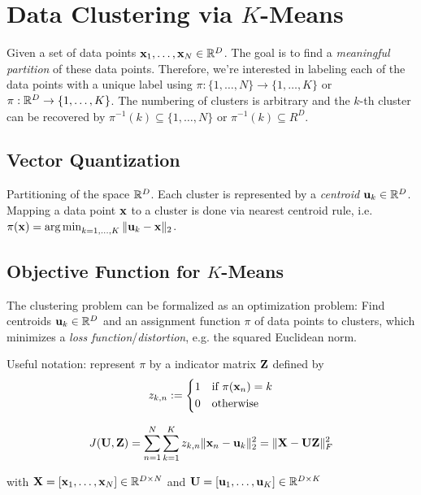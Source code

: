 \chapter{Data Clustering via \(K\)-Means}

Given a set of data points \(\mathbf{x}_1, \ldots, \mathbf{x}_N \in \mathbb{R}^D\). The goal is to find a \textit{meaningful partition} of these data points. Therefore, we're interested in labeling each of the data points with a unique label using \(\pi: \{1, \ldots, N\} \to \{1, \ldots, K\}\) or \(\pi: \mathbb{R}^D \to \{1, \ldots, K\}\). The numbering of clusters is arbitrary and the \(k\)-th cluster can be recovered by \(\pi^{-1}(k) \subseteq \{1, \ldots, N\}\) or \(\pi^{-1}(k) \subseteq R^D\).

\section{Vector Quantization}
Partitioning of the space \(\mathbb{R}^D\). Each cluster is represented by a \textit{centroid} \(\mathbf{u}_k \in \mathbb{R}^D\). Mapping a data point \(\mathbf{x}\) to a cluster is done via nearest centroid rule, i.e. \(\pi(\mathbf{x}) = \operatorname*{arg\,min}_{k=1,\ldots,K} \|\mathbf{u}_k - \mathbf{x}\|_2\).

\section{Objective Function for \(K\)-Means}
The clustering problem can be formalized as an optimization problem: Find centroids \(\mathbf{u}_k \in \mathbb{R}^D\) and an assignment function \(\pi\) of data points to clusters, which minimizes a \textit{loss function}/\textit{distortion}, e.g. the squared Euclidean norm.

Useful notation: represent \(\pi\) by a indicator matrix \(\mathbf{Z}\) defined by
\[
z_{k, n} := \begin{dcases*}
1 & if \(\pi(\matr{x}_n) = k\)\\
0 & otherwise
\end{dcases*}
\]

\begin{definition}
\[
J(\mathbf{U}, \mathbf{Z}) = \sum_{n=1}^N \sum_{k=1}^K z_{k, n} \| \mathbf{x}_n - \mathbf{u}_k \|_2^2 = \| \mathbf{X} - \mathbf{UZ} \|_F^2
\]

with \(\mathbf{X} = [\mathbf{x}_1, \ldots, \mathbf{x}_N] \in \mathbb{R}^{D \times N}\) and \(\mathbf{U} = [\mathbf{u}_1, \ldots, \mathbf{u}_K] \in \mathbb{R}^{D \times K}\)
\end{definition}

